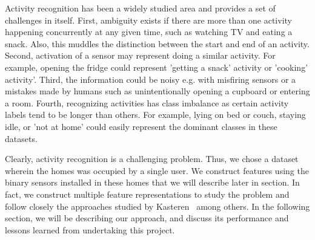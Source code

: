 \documentclass[11pt, oneside]{article}   	%
\begin{document}
Activity recognition has been a widely studied area and provides a set of challenges in itself. First, ambiguity exists if there are more than one activity happening concurrently at any given time, such as watching TV and eating a snack. Also, this muddles the distinction between the start and end of an activity. Second, activation of a sensor may represent doing a similar activity. For example, opening the fridge could represent 'getting a snack' activity or 'cooking' activity'. Third, the information could be noisy e.g. with misfiring sensors or a mistakes made by humans such as unintentionally opening a cupboard or entering a room. Fourth, recognizing activities has class imbalance as certain activity labels tend to be longer than others. For example, lying on bed or couch, staying idle, or 'not at home' could easily represent the dominant classes in these datasets. 

Clearly, activity recognition is a challenging problem. Thus, we chose a dataset wherein the homes was occupied by a single user. We construct features using the binary sensors installed in these homes that we will describe later in section. In fact, we construct multiple feature representations to study the problem and follow closely the approaches studied by Kasteren~\cite{tvkasteren} among others. In the following section, we will be describing our approach, and discuss its performance and lessons learned from undertaking this project.



\end{document}
